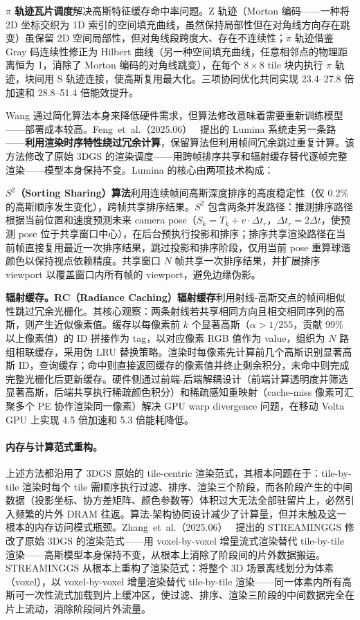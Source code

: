 \textbf{$\pi$ 轨迹瓦片调度}解决高斯特征缓存命中率问题。Z 轨迹（Morton 编码——一种将 2D 坐标交织为 1D 索引的空间填充曲线，虽然保持局部性但在对角线方向存在跳变）虽保留 2D 空间局部性，但对角线段跨度大、存在不连续性；$\pi$ 轨迹借鉴 Gray 码连续性修正为 Hilbert 曲线（另一种空间填充曲线，任意相邻点的物理距离恒为 1，消除了 Morton 编码的对角线跳变），在每个 $8\times8$ tile 块内执行 $\pi$ 轨迹，块间用 S 轨迹连接，使高斯复用最大化。三项协同优化共同实现 23.4--27.8 倍加速和 28.8--51.4 倍能效提升。

Wang 通过简化算法本身来降低硬件需求，但算法修改意味着需要重新训练模型——部署成本较高。Feng~et~al.（2025.06）~\cite{2506_05682} 提出的 Lumina 系统走另一条路——\textbf{利用渲染时序特性绕过冗余计算}，保留算法但利用帧间冗余跳过重复计算。该方法修改了原始 3DGS 的渲染调度——用跨帧排序共享和辐射缓存替代逐帧完整渲染——模型本身保持不变。Lumina 的核心由两项技术构成：

\textbf{$S^2$（Sorting Sharing）算法}利用连续帧间高斯深度排序的高度稳定性（仅 $0.2\%$ 的高斯顺序发生变化），跨帧共享排序结果。$S^2$ 包含两条并发路径：推测排序路径根据当前位置和速度预测未来 camera pose（$S_k = T_k + v \cdot \Delta t_r$，$\Delta t_r = 2\Delta t$，使预测 pose 位于共享窗口中心），在后台预执行投影和排序；排序共享渲染路径在当前帧直接复用最近一次排序结果，跳过投影和排序阶段，仅用当前 pose 重算球谐颜色以保持视点依赖精度。共享窗口 $N$ 帧共享一次排序结果，并扩展排序 viewport 以覆盖窗口内所有帧的 viewport，避免边缘伪影。

\textbf{辐射缓存。}\textbf{RC（Radiance Caching）辐射缓存}利用射线-高斯交点的帧间相似性跳过冗余光栅化。其核心观察：两条射线若共享相同方向且相交相同序列的高斯，则产生近似像素值。缓存以每像素前 $k$ 个显著高斯（$\alpha > 1/255$，贡献 99\% 以上像素值）的 ID 拼接作为 tag，以对应像素 RGB 值作为 value，组织为 $N$ 路组相联缓存，采用伪 LRU 替换策略。渲染时每像素先计算前几个高斯识别显著高斯 ID，查询缓存；命中则直接返回缓存的像素值并终止剩余积分，未命中则完成完整光栅化后更新缓存。硬件侧通过前端-后端解耦设计（前端计算透明度并筛选显著高斯，后端共享执行稀疏颜色积分）和稀疏感知重映射（cache-miss 像素可汇聚多个 PE 协作渲染同一像素）解决 GPU warp divergence 问题，在移动 Volta GPU 上实现 4.5 倍加速和 5.3 倍能耗降低。

\paragraph{内存与计算范式重构。}

上述方法都沿用了 3DGS 原始的 tile-centric 渲染范式，其根本问题在于：tile-by-tile 渲染时每个 tile 需顺序执行过滤、排序、渲染三个阶段，而各阶段产生的中间数据（投影坐标、协方差矩阵、颜色参数等）体积过大无法全部驻留片上，必然引入频繁的片外 DRAM 往返。算法-架构协同设计减少了计算量，但并未触及这一根本的内存访问模式瓶颈。Zhang~et~al.（2025.06）~\cite{2506_09070} 提出的 STREAMINGGS 修改了原始 3DGS 的渲染范式——用 voxel-by-voxel 增量流式渲染替代 tile-by-tile 渲染——高斯模型本身保持不变，从根本上消除了阶段间的片外数据搬运。STREAMINGGS 从根本上重构了渲染范式：将整个 3D 场景离线划分为体素（voxel），以 voxel-by-voxel 增量渲染替代 tile-by-tile 渲染——同一体素内所有高斯可一次性流式加载到片上缓冲区，使过滤、排序、渲染三阶段的中间数据完全在片上流动，消除阶段间片外流量。

